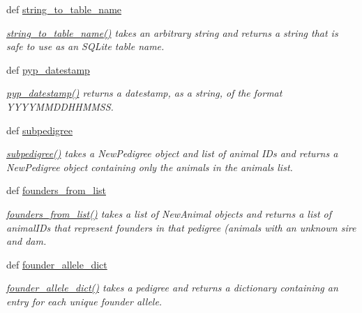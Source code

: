 \begin{CompactItemize}
def \hyperlink{namespacePyPedal_1_1pyp__utils_fc1754422578dce211ca2b92dd93290b}{string\_\-to\_\-table\_\-name}
\begin{CompactList}\small\item\em \hyperlink{namespacePyPedal_1_1pyp__utils_fc1754422578dce211ca2b92dd93290b}{string\_\-to\_\-table\_\-name()} takes an arbitrary string and returns a string that is safe to use as an SQLite table name. \item\end{CompactList}\item 
def \hyperlink{namespacePyPedal_1_1pyp__utils_bded02aaf1c6d3412cbdf3f3329b90cc}{pyp\_\-datestamp}
\begin{CompactList}\small\item\em \hyperlink{namespacePyPedal_1_1pyp__utils_bded02aaf1c6d3412cbdf3f3329b90cc}{pyp\_\-datestamp()} returns a datestamp, as a string, of the format YYYYMMDDHHMMSS. \item\end{CompactList}\item 
def \hyperlink{namespacePyPedal_1_1pyp__utils_5e35fcbb221870be99c0c9940f5a01de}{subpedigree}
\begin{CompactList}\small\item\em \hyperlink{namespacePyPedal_1_1pyp__utils_5e35fcbb221870be99c0c9940f5a01de}{subpedigree()} takes a New\-Pedigree object and list of animal IDs and returns a New\-Pedigree object containing only the animals in the animals list. \item\end{CompactList}\item 
def \hyperlink{namespacePyPedal_1_1pyp__utils_6dfbe8b07bcf8642a234d9e37ac1d475}{founders\_\-from\_\-list}
\begin{CompactList}\small\item\em \hyperlink{namespacePyPedal_1_1pyp__utils_6dfbe8b07bcf8642a234d9e37ac1d475}{founders\_\-from\_\-list()} takes a list of New\-Animal objects and returns a list of animal\-IDs that represent founders in that pedigree (animals with an unknown sire and dam. \item\end{CompactList}\item 
def \hyperlink{namespacePyPedal_1_1pyp__utils_571a7b0f820ad19e66b570ec6a11fd30}{founder\_\-allele\_\-dict}
\begin{CompactList}\small\item\em \hyperlink{namespacePyPedal_1_1pyp__utils_571a7b0f820ad19e66b570ec6a11fd30}{founder\_\-allele\_\-dict()} takes a pedigree and returns a dictionary containing an entry for each unique founder allele. \item\end{CompactList}\item 

\end{CompactItemize}

